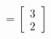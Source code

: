 \documentclass[preview]{standalone}
\begin{document}
\begin{align*}
= \begin{bmatrix} 3 \\ 2 \end{bmatrix}
\end{align*}
\end{document}
